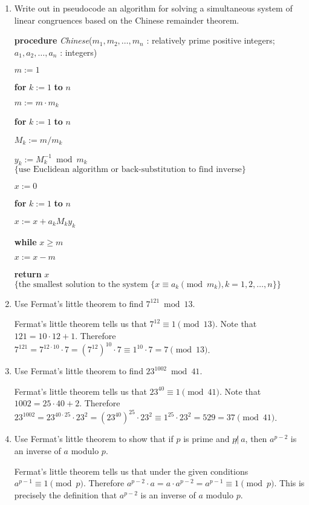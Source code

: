 \documentclass[11pt]{article}
\begin{document}
\begin{enumerate}[label=\textbf{\arabic*.}]
	\item Write out in pseudocode an algorithm for solving a simultaneous system of linear congruences based on the Chinese remainder theorem.
	
	\textbf{procedure} \emph{Chinese}($m_1, m_2, \ldots, m_n$ : relatively prime positive integers; $a_1, a_2, \ldots, a_n$ : integers)
	
	$m := 1$
	
	\textbf{for} $k := 1$ \textbf{to} $n$
	
	\qquad $m := m \cdot m_k$
	
	\textbf{for} $k := 1$ \textbf{to} $n$
	
	\qquad $M_k := m / m_k$
	
	\qquad $y_k := M_k^{-1} \bmod m_k$ $\{ \text{use Euclidean algorithm or back-substitution to find inverse} \}$
	
	$x := 0$
	
	\textbf{for} $k := 1$ \textbf{to} $n$
	
	\qquad $x := x + a_k M_k y_k$
	
	\textbf{while} $x \geq m$
	
	\qquad $x := x - m$
	
	\textbf{return} $x$ $\{ \text{the smallest solution to the system } \{ x \equiv a_k \pmod{m_k}, k = 1, 2, \ldots, n \} \}$
	
	\item Use Fermat's little theorem to find $7^{121} \bmod 13$.
	
	Fermat's little theorem tells us that $7^{12} \equiv 1 \pmod{13}$. Note that $121 = 10 \cdot 12 + 1$. Therefore $7^{121} = 7^{12 \cdot 10} \cdot 7 = (7^{12})^{10} \cdot 7 \equiv 1^{10} \cdot 7 = 7 \pmod{13}$.
	
	\item Use Fermat's little theorem to find $23^{1002} \bmod 41$.
	
	Fermat's little theorem tells us that $23^{40} \equiv 1 \pmod{41}$. Note that $1002 = 25 \cdot 40 + 2$. Therefore $23^{1002} = 23^{40 \cdot 25} \cdot 23^2 = (23^{40})^{25} \cdot 23^2 \equiv 1^{25} \cdot 23^2 = 529 = 37 \pmod{41}$.
	
	\item Use Fermat's little theorem to show that if $p$ is prime and $p \not|\ a$, then $a^{p - 2} $ is an inverse of $a$ modulo $p$.
	
	Fermat's little theorem tells us that under the given conditions $a^{p - 1} \equiv 1 \pmod{p}$. Therefore $a^{p - 2} \cdot a = a \cdot a^{p - 2} = a^{p - 1} \equiv 1 \pmod{p}$. This is precisely the definition that $a^{p - 2}$ is an inverse of $a$ modulo $p$.
\end{enumerate}
\end{document}

